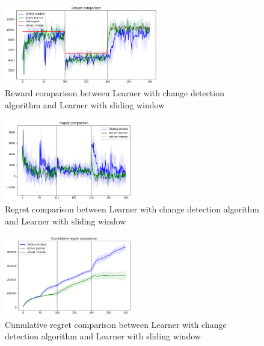 \begin{figure}[ht]
    \begin{center}
    \includegraphics[width=0.6\textwidth]{img/sw_vs_active_reward.png}
    \caption{Reward comparison between Learner with change detection algorithm and Learner with sliding window}
    \label{fig:reward63}
    \end{center}
\end{figure}
\begin{multicols}{2}
    \begin{figure}[H]
        \begin{center}
        \includegraphics[width=0.5\textwidth]{img/sw_vs_active_regret.png}
        \caption{Regret comparison between Learner with change detection algorithm and Learner with sliding window}
        \label{fig:regret63}
        \end{center}
    \end{figure}
    \columnbreak
    \begin{figure}[H]
        \begin{center}
        \includegraphics[width=0.5\textwidth]{img/sw_vs_active_cum_reg.png}
        \caption{Cumulative regret comparison between Learner with change detection algorithm and Learner with sliding window}
        \label{fig:cum_reg63}
        \end{center}
    \end{figure}
\end{multicols}

